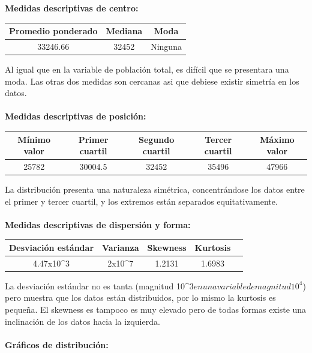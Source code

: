 \documentclass[11pt]{article}
\begin{document}
\textbf{Medidas descriptivas de centro:}

\begin{center}
\begin{tabular}{|c|c|c|}
    \hline
    Promedio ponderado & Mediana & Moda \\ \hline
    33246.66 & 32452 & Ninguna \\
    \hline
\end{tabular}
\end{center}

Al igual que en la variable de población total, es difícil que se presentara una moda. Las otras dos medidas son cercanas asi que debiese existir simetría en los datos.
\\
\\
\textbf{Medidas descriptivas de posición:}

\begin{center}
\begin{tabular}{|c|c|c|c|c|}
    \hline
    Mínimo valor & Primer cuartil & Segundo cuartil & Tercer cuartil & Máximo valor\\ \hline
    25782 & 30004.5 & 32452 & 35496 & 47966\\
    \hline
\end{tabular}
\end{center}

La distribución presenta una naturaleza simétrica, concentrándose los datos entre el primer y tercer cuartil, y los extremos están separados equitativamente.
\\
\\
\textbf{Medidas descriptivas de dispersión y forma:}

\begin{center}
\begin{tabular}{|c|c|c|c|c|}
    \hline
    Desviación estándar  & Varianza & Skewness & Kurtosis\\ \hline
    4.47x10^3 & 2x10^7 & 1.2131 & 1.6983\\
    \hline
\end{tabular}
\end{center}

La desviación estándar no es tanta (magnitud 10^3$ en una variable de magnitud 10^4$) pero muestra que los datos están distribuidos, por lo mismo la kurtosis es pequeña. El skewness es tampoco es muy elevado pero de todas formas existe una inclinación de los datos hacia la izquierda.
\\
\\
\textbf{Gráficos de distribución:}
\\
\end{document}

